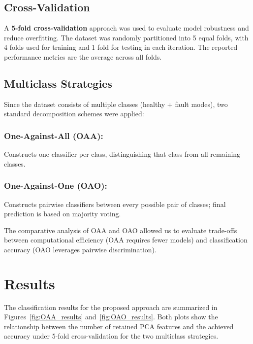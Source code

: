 \documentclass[12pt,a4paper]{article}
\begin{document}
\begin{multicols}{2}
\subsection{Cross-Validation}
A \textbf{5-fold cross-validation} approach was used to evaluate model robustness and reduce overfitting. The dataset was randomly partitioned into 5 equal folds, with 4 folds used for training and 1 fold for testing in each iteration. The reported performance metrics are the average across all folds.

\subsection{Multiclass Strategies}
Since the dataset consists of multiple classes (healthy + fault modes), two standard decomposition schemes were applied:
\subsubsection*{One-Against-All (OAA):} Constructs one classifier per class, distinguishing that class from all remaining classes.
\subsubsection*{One-Against-One (OAO):} Constructs pairwise classifiers between every possible pair of classes; final prediction is based on majority voting.

The comparative analysis of OAA and OAO allowed us to evaluate trade-offs between computational efficiency (OAA requires fewer models) and classification accuracy (OAO leverages pairwise discrimination).

\section{Results}
\label{sec:results}
The classification results for the proposed approach are summarized in 
Figures~\ref{fig:OAA_results} and~\ref{fig:OAO_results}. Both plots show the 
relationship between the number of retained PCA features and the achieved 
accuracy under 5-fold cross-validation for the two multiclass strategies.


\end{multicols}
\end{document}
